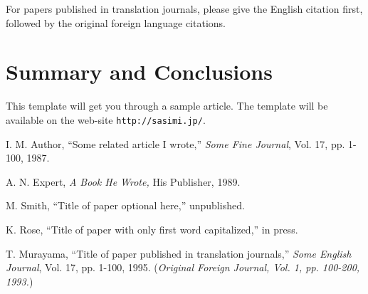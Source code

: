 \documentclass[twocolumn]{article}
\begin{document}
For papers published in translation journals, please give the English
citation first, followed by the original foreign language
citations\cite{trans}.


\section{Summary and Conclusions}
This template will get you through a sample article.  The template
will be available on the web-site \verb|http://sasimi.jp/|.





\begin{thebibliography}{9}
\footnotesize
{}
I. M. Author,
``Some related article I wrote,''
{\em Some Fine Journal}, Vol. 17, pp. 1-100, 1987.

A. N. Expert,
{\em A Book He Wrote,}				     
His Publisher, 1989.

M. Smith,
``Title of paper optional here,''
unpublished.

K. Rose,
``Title of paper with only first word capitalized,''
in press.

T. Murayama,
``Title of paper published in translation journals,''
{\em Some English Journal}, Vol. 17, pp. 1-100, 1995.
({\em Original Foreign Journal, Vol. 1, pp. 100-200, 1993.})


\end{thebibliography}
\end{document}
